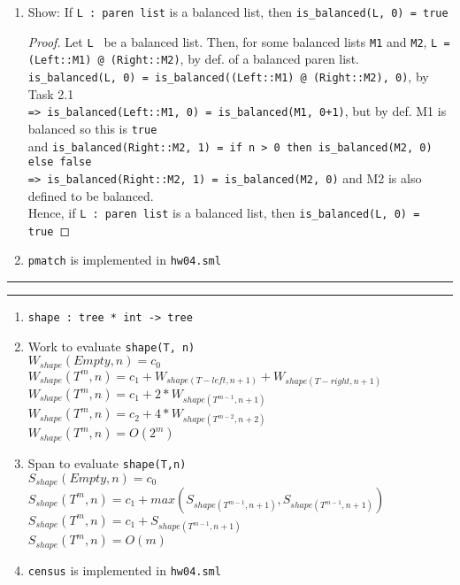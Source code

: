 \documentclass[11pt]{article}
\newcommand{\question}[2] {\vspace{.25in} \hrule\vspace{0.5em}
\noindent{\bf #1: #2} \vspace{0.5em}
\hrule \vspace{.10in}}
\begin{document}
\begin{enumerate}
\item Show: If \verb|L : paren list| is a balanced list, then \verb|is_balanced(L, 0) = true| 
\begin{proof}
Let \verb|L | be a balanced list.  Then, for some balanced lists \verb|M1| and \verb|M2|, \verb|L = (Left::M1) @ (Right::M2)|, by def. of a balanced paren list.\\
\verb|is_balanced(L, 0) = is_balanced((Left::M1) @ (Right::M2), 0)|, by Task 2.1\\
\verb|=> is_balanced(Left::M1, 0) = is_balanced(M1, 0+1)|, but by def. M1 is balanced so this is \verb|true|\\
and \verb|is_balanced(Right::M2, 1) = if n > 0 then is_balanced(M2, 0) else false|\\
\verb|=> is_balanced(Right::M2, 1) = is_balanced(M2, 0)| and M2 is also defined to be balanced.\\
Hence, if \verb|L : paren list| is a balanced list, then \verb|is_balanced(L, 0) = true|
\end{proof}
\item \verb|pmatch| is implemented in \verb|hw04.sml|
\end{enumerate}

\question{3}{Full Trees}
\begin{enumerate}
\item \verb|shape : tree * int -> tree|
\item Work to evaluate \verb|shape(T, n)|\\
$W_{shape}(Empty, n) = c_0$\\
$W_{shape}(T^m, n) = c_1 + W_{shape(T-left, n+1)} + W_{shape(T-right, n+1)}$\\
$W_{shape}(T^m, n) = c_1 + 2*W_{shape(T^{m-1}, n+1)}$\\
$W_{shape}(T^m, n) = c_2 + 4*W_{shape(T^{m-2}, n+2)}$\\
$W_{shape}(T^m, n) = O(2^m)$
\item Span to evaluate \verb|shape(T,n)|\\
$S_{shape}(Empty, n) = c_0$\\
$S_{shape}(T^m, n) = c_1 + max(S_{shape(T^{m-1}, n+1)}, S_{shape(T^{m-1}, n+1)})$\\
$S_{shape}(T^m, n) = c_1 + S_{shape(T^{m-1}, n+1)}$\\
$S_{shape}(T^m, n) = O(m)$
\item \verb|census| is implemented in \verb|hw04.sml|
\end{enumerate}
\end{document}
